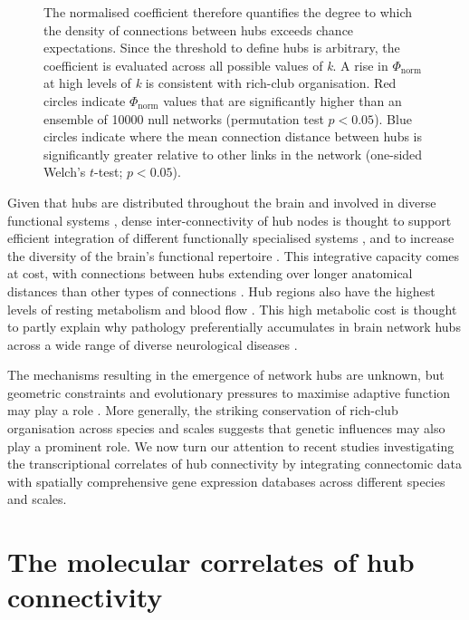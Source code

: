\begin{figure}[h!]
{The normalised coefficient therefore quantifies the degree to which the density of connections between hubs exceeds chance expectations. Since the threshold to define hubs is arbitrary, the coefficient is evaluated across all possible values of \textit{k}.
A rise in $\Phi_\mathrm{norm}$ at high levels of \textit{k} is consistent with rich-club organisation. Red circles indicate $\Phi_\mathrm{norm}$ values that are significantly higher than an ensemble of \num{10000} null networks (permutation test $p < 0.05$).
Blue circles indicate where the mean connection distance between hubs is significantly greater relative to other links in the network (one-sided Welch’s $t$-test; $p < 0.05$). }
\label{fig:Ch3Fig2}
\end{figure}

Given that hubs are distributed throughout the brain and involved in diverse functional systems \citep{DeReus2013b,VandenHeuvel2013a,Fulcher2016}, dense inter-connectivity of hub nodes is thought to support efficient integration of different functionally specialised systems \citep{VandenHeuvel2012}, and to increase the diversity of the brain’s functional repertoire \citep{Senden2014}.
This integrative capacity comes at cost, with connections between hubs extending over longer anatomical distances than other types of connections \citep{VandenHeuvel2011,Harriger2012,Fulcher2016,Arnatkeviciute2018}.
Hub regions also have the highest levels of resting metabolism \citep{Vaishnavi2010,Tomasi2013} and blood flow \citep{Liang2013a}.
This high metabolic cost is thought to partly explain why pathology preferentially accumulates in brain network hubs across a wide range of diverse neurological diseases \citep{Bullmore2012,Crossley2014,Fornito2015}.

The mechanisms resulting in the emergence of network hubs are unknown, but geometric constraints and evolutionary pressures to maximise adaptive function may play a role \citep{Henderson2014,Roberts2016,Betzel2017}. More generally, the striking conservation of rich-club organisation across species and scales suggests that genetic influences may also play a prominent role. We now turn our attention to recent studies investigating the transcriptional correlates of hub connectivity by integrating connectomic data with spatially comprehensive gene expression databases across different species and scales.

\section{The molecular correlates of hub connectivity}

